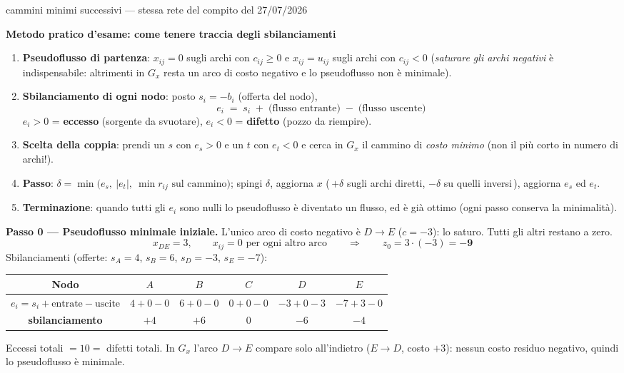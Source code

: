 \documentclass[11pt,a4paper]{article}
\begin{document}
\begin{es}{cammini minimi successivi --- stessa rete del compito del 27/07/2026}
\begin{tcolorbox}[colback=lightbg,colframe=navy,arc=2pt,boxrule=0.8pt,left=6pt,right=6pt,top=5pt,bottom=5pt]
\textbf{Metodo pratico d'esame: come tenere traccia degli sbilanciamenti}
\begin{enumerate}[leftmargin=1.2em,itemsep=0.2em]
\item \textbf{Pseudoflusso di partenza}: $x_{ij}=0$ sugli archi con $c_{ij}\ge 0$ e
      $x_{ij}=u_{ij}$ sugli archi con $c_{ij}<0$ (\emph{saturare gli archi negativi} è
      indispensabile: altrimenti in $G_x$ resta un arco di costo negativo e lo pseudoflusso non è minimale).
\item \textbf{Sbilanciamento di ogni nodo}: posto $s_i=-b_i$ (offerta del nodo),
      \[ e_i \;=\; s_i \;+\; \text{(flusso entrante)} \;-\; \text{(flusso uscente)} \]
      $e_i>0$ = \textbf{eccesso} (sorgente da svuotare), $e_i<0$ = \textbf{difetto} (pozzo da riempire).
\item \textbf{Scelta della coppia}: prendi un $s$ con $e_s>0$ e un $t$ con $e_t<0$ e cerca in $G_x$
      il cammino di \emph{costo minimo} (non il più corto in numero di archi!).
\item \textbf{Passo}: $\delta = \min\big(e_s,\ |e_t|,\ \min r_{ij}\text{ sul cammino}\big)$; spingi $\delta$,
      aggiorna $x$ (\,$+\delta$ sugli archi diretti, $-\delta$ su quelli inversi\,), aggiorna $e_s$ ed $e_t$.
\item \textbf{Terminazione}: quando tutti gli $e_i$ sono nulli lo pseudoflusso è diventato un flusso,
      ed è già ottimo (ogni passo conserva la minimalità).
\end{enumerate}
\end{tcolorbox}

\textbf{Passo 0 --- Pseudoflusso minimale iniziale.}
L'unico arco di costo negativo è $D\to E$ ($c=-3$): lo saturo. Tutti gli altri restano a zero.
\[
x_{DE}=3,\qquad x_{ij}=0 \text{ per ogni altro arco}
\qquad\Longrightarrow\qquad z_0 = 3\cdot(-3) = \mathbf{-9}
\]
Sbilanciamenti (offerte: $s_A=4$, $s_B=6$, $s_D=-3$, $s_E=-7$):
\begin{center}
\small
\begin{tabular}{@{}cccccc@{}}
\toprule
\textbf{Nodo} & $A$ & $B$ & $C$ & $D$ & $E$\\
\midrule
$e_i = s_i + \text{entrate} - \text{uscite}$ & $4+0-0$ & $6+0-0$ & $0+0-0$ & $-3+0-3$ & $-7+3-0$\\
\textbf{sbilanciamento} & $+4$ & $+6$ & $0$ & $-6$ & $-4$\\
\bottomrule
\end{tabular}
\end{center}
Eccessi totali $=10=$ difetti totali. In $G_x$ l'arco $D\to E$ compare solo all'indietro
($E\to D$, costo $+3$): nessun costo residuo negativo, quindi lo pseudoflusso è minimale. \checkmark


\end{es}
\end{document}
